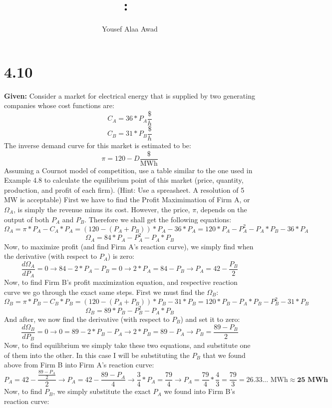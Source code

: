 \documentclass{article}
\title{
    \vspace{2in}
    \textmd{\textbf{\hmwkClass:\ \hmwkTitle}}\\
    \normalsize\vspace{0.1in}
    \vspace{3in}
}
\author{Yousef Alaa Awad}
\begin{document}
\maketitle
\pagebreak

\section{4.10}
\textbf{Given:} Consider a market for electrical energy that is supplied by two generating companies whose cost functions are:
$$ C_A = 36*P_A\frac{\$}{h} $$
$$ C_B = 31*P_B\frac{\$}{h} $$
The inverse demand curve for this market is estimated to be:
$$ \pi = 120 - D\frac{\$}{\text{MWh}} $$
Assuming a Cournot model of competition, use a table similar to the one used in Example 4.8 to calculate the equilibrium point of this market (price, quantity, production, and profit of each firm). (Hint: Use a spreasheet. A resolution of 5 MW is acceptable)
\newline
First we have to find the Profit Maximimation of Firm A, or $\Omega_A$, is simply the revenue minus its cost. However, the price, $\pi$, depends on the output of both $P_A$ and $P_B$. Therefore we shall get the following equations:
$$ \Omega_A = \pi*P_A - C_A*P_A = (120 - (P_A + P_B))*P_A - 36*P_A = 120*P_A - P_A^2 - P_A*P_B - 36*P_A $$
$$ \Omega_A = 84*P_A - P_A^2 - P_A*P_B $$
Now, to maximize profit (and find Firm A's reaction curve), we simply find when the derivative (with respect to $P_A$) is zero:
$$ \frac{d\Omega_A}{dP_A} = 0 \rightarrow 84 - 2*P_A - P_B = 0 \rightarrow 2*P_A = 84 - P_B \rightarrow P_A = 42 - \frac{P_B}{2} $$
Now, to find Firm B's profit maximization equation, and respective reaction curve we go through the exact same steps. First we must find the $\Omega_B$:
$$ \Omega_B = \pi*P_B - C_B*P_B = (120 - (P_A + P_B))*P_B - 31*P_B = 120*P_B - P_A*P_B - P_B^2 - 31*P_B $$
$$ \Omega_B = 89*P_B - P_B^2 - P_A*P_B $$
And after, we now find the derivative (with respect to $P_B$) and set it to zero:
$$ \frac{d\Omega_B}{dP_B} = 0\rightarrow 0 = 89 - 2*P_B - P_A \rightarrow 2*P_B = 89 - P_A \rightarrow P_B = \frac{89-P_B}{2} $$
Now, to find equilibrium we simply take these two equations, and substitute one of them into the other. In this case I will be substituting the $P_B$ that we found above from Firm B into Firm A's reaction curve:
$$ P_A = 42 - \frac{\frac{89-P_A}{2}}{2} \rightarrow P_A = 42 - \frac{89 - P_A}{4} \rightarrow \frac{3}{4}*P_A = \frac{79}{4} \rightarrow P_A = \frac{79}{4}*\frac{4}{3} = \frac{79}{3} = 26.33\text{... MWh} \approx \textbf{25 MWh}$$
Now, to find $P_B$, we simply substitute the exact $P_A$ we found into Firm B's reaction curve:
\end{document}
